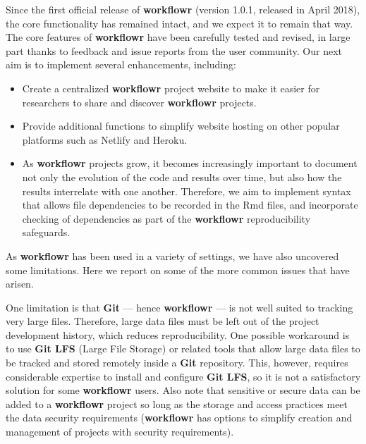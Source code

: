 \documentclass[9pt,a4paper]{extarticle}
\begin{document}
Since the first official release of \textbf{workflowr} (version 1.0.1, released
in April 2018), the core functionality has remained intact, and we
expect it to remain that way. The core features of \textbf{workflowr} have been
carefully tested and revised, in large part thanks to feedback and issue
reports from the user community. Our next aim is to implement several
enhancements, including:

\begin{itemize}

\item Create a centralized \textbf{workflowr} project website to make it easier
for researchers to share and discover \textbf{workflowr} projects.

\item Provide additional functions to simplify website hosting on other
popular platforms such as Netlify and Heroku.

\item As \textbf{workflowr} projects grow, it becomes increasingly important to
document not only the evolution of the code and results over time, but
also how the results interrelate with one another. Therefore, we aim to
implement syntax that allows file dependencies to be recorded in the Rmd
files, and incorporate checking of dependencies as part of the \textbf{workflowr}
reproducibility safeguards.

\end{itemize}

As \textbf{workflowr} has been used in a variety of settings, we have also
uncovered some limitations. Here we report on some of the more common
issues that have arisen.

One limitation is that \textbf{Git} --- hence \textbf{workflowr} --- is not well suited to
tracking very large files. Therefore, large data files must be left out
of the project development history, which reduces reproducibility. One
possible workaround is to use \textbf{Git LFS} (Large File Storage) or related
tools that allow large data files to be tracked and stored remotely
inside a \textbf{Git} repository. This, however, requires considerable expertise
to install and configure \textbf{Git LFS}, so it is not a satisfactory solution
for some \textbf{workflowr} users. Also note that sensitive or secure data can be
added to a \textbf{workflowr} project so long as the storage and access practices
meet the data security requirements  (\textbf{workflowr} has options to simplify
creation and management of projects with security requirements).
\end{document}
